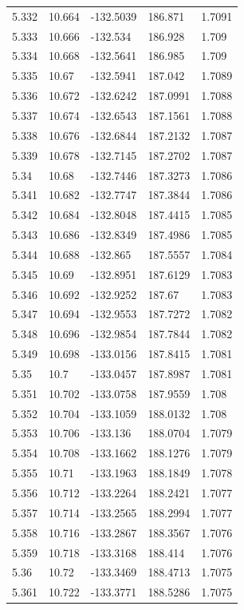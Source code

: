 \begin{tabular}{lllll}
5.332 & 10.664 & -132.5039 & 186.871 & 1.7091 \\
5.333 & 10.666 & -132.534 & 186.928 & 1.709 \\
5.334 & 10.668 & -132.5641 & 186.985 & 1.709 \\
5.335 & 10.67 & -132.5941 & 187.042 & 1.7089 \\
5.336 & 10.672 & -132.6242 & 187.0991 & 1.7088 \\
5.337 & 10.674 & -132.6543 & 187.1561 & 1.7088 \\
5.338 & 10.676 & -132.6844 & 187.2132 & 1.7087 \\
5.339 & 10.678 & -132.7145 & 187.2702 & 1.7087 \\
5.34 & 10.68 & -132.7446 & 187.3273 & 1.7086 \\
5.341 & 10.682 & -132.7747 & 187.3844 & 1.7086 \\
5.342 & 10.684 & -132.8048 & 187.4415 & 1.7085 \\
5.343 & 10.686 & -132.8349 & 187.4986 & 1.7085 \\
5.344 & 10.688 & -132.865 & 187.5557 & 1.7084 \\
5.345 & 10.69 & -132.8951 & 187.6129 & 1.7083 \\
5.346 & 10.692 & -132.9252 & 187.67 & 1.7083 \\
5.347 & 10.694 & -132.9553 & 187.7272 & 1.7082 \\
5.348 & 10.696 & -132.9854 & 187.7844 & 1.7082 \\
5.349 & 10.698 & -133.0156 & 187.8415 & 1.7081 \\
5.35 & 10.7 & -133.0457 & 187.8987 & 1.7081 \\
5.351 & 10.702 & -133.0758 & 187.9559 & 1.708 \\
5.352 & 10.704 & -133.1059 & 188.0132 & 1.708 \\
5.353 & 10.706 & -133.136 & 188.0704 & 1.7079 \\
5.354 & 10.708 & -133.1662 & 188.1276 & 1.7079 \\
5.355 & 10.71 & -133.1963 & 188.1849 & 1.7078 \\
5.356 & 10.712 & -133.2264 & 188.2421 & 1.7077 \\
5.357 & 10.714 & -133.2565 & 188.2994 & 1.7077 \\
5.358 & 10.716 & -133.2867 & 188.3567 & 1.7076 \\
5.359 & 10.718 & -133.3168 & 188.414 & 1.7076 \\
5.36 & 10.72 & -133.3469 & 188.4713 & 1.7075 \\
5.361 & 10.722 & -133.3771 & 188.5286 & 1.7075 \\

\end{tabular}
